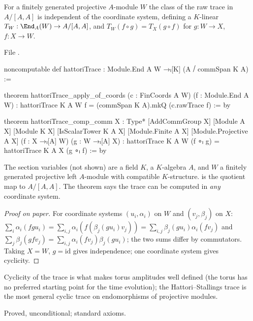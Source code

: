 \begin{theorem}\label{l18:thm:HS}
For a finitely generated projective $A$-module $W$ the class of the raw trace in $A/[A,A]$ is independent of the
coordinate system, defining a $K$-linear $T_W:\End_A(W)\to A/[A,A]$, and $T_W(f\circ g)=T_X(g\circ f)$ for
$g:W\to X$, $f:X\to W$.
\end{theorem}
\noindent File .
\begin{leancode}
noncomputable def hattoriTrace : Module.End A W →ₗ[K] (A ⧸ commSpan K A) :=

theorem hattoriTrace_apply_of_coords (c : FinCoords A W) (f : Module.End A W) :
    hattoriTrace K A W f = (commSpan K A).mkQ (c.rawTrace f) := by

theorem hattoriTrace_comp_comm {X : Type*} [AddCommGroup X] [Module A X] [Module K X]
    [IsScalarTower K A X] [Module.Finite A X] [Module.Projective A X]
    (f : X →ₗ[A] W) (g : W →ₗ[A] X) :
    hattoriTrace K A W (f ∘ₗ g) = hattoriTrace K A X (g ∘ₗ f) := by
\end{leancode}
\begin{dictionary}
The section variables (not shown) are a field $K$, a $K$-algebra $A$, and $W$ a finitely generated projective left
$A$-module with compatible $K$-structure.  is the quotient map to $A/[A,A]$. The theorem
 says the trace can be computed in \emph{any} coordinate system.
\end{dictionary}
\begin{proof}[Proof on paper]
For coordinate systems $(u_i,\alpha_i)$ on $W$ and $(v_j,\beta_j)$ on $X$:
$\sum_i\alpha_i(fg u_i)=\sum_{i,j}\alpha_i(f(\beta_j(gu_i)v_j))=\sum_{i,j}\beta_j(gu_i)\alpha_i(fv_j)$ and
$\sum_j\beta_j(gfv_j)=\sum_{i,j}\alpha_i(fv_j)\beta_j(gu_i)$; the two sums differ by commutators. Taking $X=W$, $g=\mathrm{id}$
gives independence; one coordinate system gives cyclicity.
\end{proof}
\begin{physics}
Cyclicity of the trace is what makes torus amplitudes well defined (the torus has no preferred starting point
for the time evolution); the Hattori--Stallings trace is the most general cyclic trace on endomorphisms of
projective modules.
\end{physics}
\begin{status}
Proved, unconditional; standard axioms.
\end{status}

